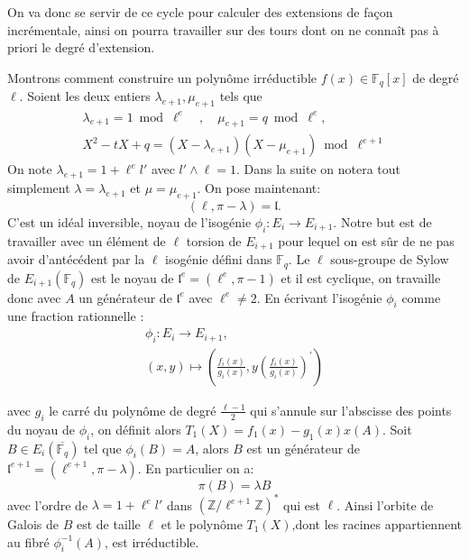 \documentclass[10pt,a4paper]{book}
\theoremstyle{plain}
\theoremstyle{definition}
\theoremstyle{definition}
\theoremstyle{definition}
\theoremstyle{definition}
\theoremstyle{remark}
\theoremstyle{remark}
\begin{document}
On va donc se servir de ce cycle pour calculer des extensions de façon incrémentale, ainsi on pourra travailler sur des tours dont on ne connaît pas à priori le degré d'extension. 

Montrons comment construire un polynôme irréductible $f(x) \in \mathbb{F}_q[x]$ de degré $\ell$. Soient  les deux entiers $\lambda_{e+1}, \mu_{e+1}$ tels que 
\begin{align*}
\lambda_{e+1}=1 \bmod \ell^{e} \quad , \quad \mu_{e+1}=q \bmod \ell^e, \\
X^2-tX+q = (X-\lambda_{e+1})(X-\mu_{e+1}) \bmod \ell^{e+1} 
\end{align*}
On note $\lambda_{e+1}=1+\ell^el'$ avec $l' \wedge \ell = 1$. Dans la suite on notera tout simplement $\lambda=\lambda_{e+1}$ et $\mu = \mu_{e+1}$. On pose maintenant:
\begin{equation*}
(\ell,\pi-\lambda)=\mathfrak{l}.
\end{equation*}
C'est un idéal inversible, noyau de l'isogénie $\phi_{i}:E_i \to E_{i+1}$. Notre but est de travailler avec un élément de $\ell$ torsion de $E_{i+1}$ pour lequel on est sûr de ne pas avoir d'antécédent par la $\ell$ isogénie défini dans $\mathbb{F}_q$. Le $\ell$ sous-groupe de Sylow de $E_{i+1}(\mathbb{F}_q)$ est le noyau de $\mathfrak{l}^e=(\ell^e,\pi - 1)$ et il est cyclique, on travaille donc avec $A$ un générateur de $\mathfrak{l}^e$ avec $\ell^e \neq 2$. En écrivant l'isogénie $\phi_i$ comme une fraction rationnelle : 
\begin{align*}
\phi_{i}:E_i \to E_{i+1}, \\
(x,y) \mapsto \left( \frac{f_{i}(x)}{g_{i}(x)} ,y \left( \frac{f_{i}(x)}{g_{i}(x)} \right) ^{'} \right)
\end{align*}

avec $g_i$ le carré du polynôme de degré $\frac{\ell-1}{2}$  qui s'annule sur l'abscisse des points du noyau de $\phi_{i}$, on  définit alors $ T_{1}(X)=f_{1}(x)-g_{1}(x)x(A)$. Soit $B \in E_i(\overline{\mathbb{F}_q})$ tel que $\phi_i(B)=A$, alors  $B$ est un générateur de $\mathfrak{l}^{e+1}=(\ell^{e+1},\pi-\lambda)$. En particulier on a:
\begin{equation*}
\pi(B)=\lambda B
\end{equation*}
avec l'ordre de $\lambda=1+\ell^el'$ dans $(\mathbb{Z}/\ell^{e+1}\mathbb{Z})^*$ qui est $\ell$. Ainsi l'orbite de Galois de $B$ est de taille $\ell$ et le polynôme $T_{1}(X)$,dont les racines appartiennent au fibré $\phi_i^{-1}(A)$, est irréductible. 
\end{document}
